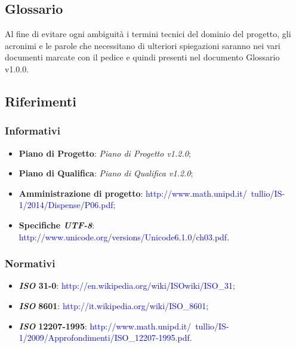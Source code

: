 \subsection{Glossario}
Al fine di evitare ogni ambiguità i termini tecnici del dominio del progetto, gli acronimi e le parole che necessitano di ulteriori spiegazioni saranno nei vari documenti marcate con il pedice  e quindi presenti nel documento Glossario v1.0.0.

\subsection{Riferimenti}
\subsubsection{Informativi}
\begin{itemize}
\item
\textbf{Piano di Progetto}: \textit{Piano di Progetto v1.2.0};
\item
\textbf{Piano di Qualifica}: \textit{Piano di Qualifica v1.2.0};
\item
\textbf{Amministrazione di progetto}: \textcolor{blue} {http://www.math.unipd.it/~tullio/IS-1/2014/Dispense/P06.pdf};
\item
\textbf{Specifiche \textit{UTF-8}}: \textcolor{blue}{http://www.unicode.org/versions/Unicode6.1.0/ch03.pdf}.
\end{itemize}

\subsubsection{Normativi}
\begin{itemize}
\item
\textbf{\textit{ISO} 31-0}: \textcolor{blue}{http://en.wikipedia.org/wiki/ISOwiki/ISO\_31};
\item
\textbf{\textit{ISO}} \textbf{8601}: \textcolor{blue}{http://it.wikipedia.org/wiki/ISO\_8601};
\item
\textbf{\textit{ISO}} \textbf{12207-1995}: \textcolor{blue} {http://www.math.unipd.it/~tullio/IS-1/2009/Approfondimenti/ISO\_12207-1995.pdf}.

\end{itemize}